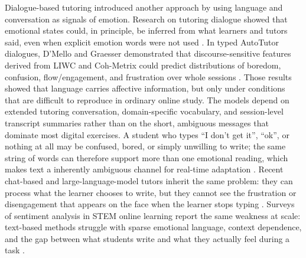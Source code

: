 Dialogue-based tutoring introduced another approach by using language and conversation as signals of emotion. Research on tutoring dialogue showed that emotional states could, in principle, be inferred from what learners and tutors said, even when explicit emotion words were not used \cite{DMello2008AutomaticDetectionLearnersAffect}. In typed \ac{AutoTutor} dialogues, D'Mello and Graesser demonstrated that discourse-sensitive features derived from \ac{LIWC} and \ac{Coh-Metrix} could predict distributions of boredom, confusion, flow/engagement, and frustration over whole sessions \cite{dmello_language_2012,Graesser2004AutoTutorDialogue}. Those results showed that language carries affective information, but only under conditions that are difficult to reproduce in ordinary online study. The models depend on extended tutoring conversation, domain-specific vocabulary, and session-level transcript summaries rather than on the short, ambiguous messages that dominate most digital exercises. A student who types ``I don't get it'', ``ok'', or nothing at all may be confused, bored, or simply unwilling to write; the same string of words can therefore support more than one emotional reading, which makes text a inherently ambiguous channel for real-time adaptation \cite{dmello_language_2012,Lavoue2017EmotionalDataCollection}. Recent chat-based and large-language-model tutors inherit the same problem: they can process what the learner chooses to write, but they cannot see the frustration or disengagement that appears on the face when the learner stops typing \cite{gutierrez_development_2025,meng_self-evolving_2025}. Surveys of sentiment analysis in STEM online learning report the same weakness at scale: text-based methods struggle with sparse emotional language, context dependence, and the gap between what students write and what they actually feel during a task \cite{anwar_emotions_2023,florestiyanto_emotion_2024}.

